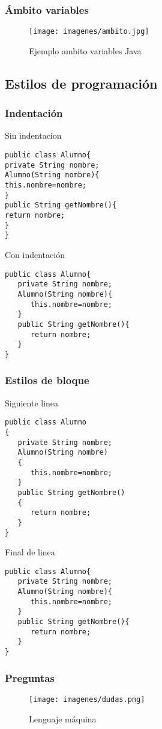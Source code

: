 \documentclass{beamer}
\begin{document}
\begin{frame}
\frametitle{Ámbito variables} 
\begin{figure}
\texttt{[image: imagenes/ambito.jpg]} 
\caption{Ejemplo ambito variables Java}
\end{figure} 
\end{frame}

\subsection{Estilos de programación}
\begin{frame}[fragile]
\frametitle{Indentación} 
\begin{small}
\begin{multicols}{2}
\begin{block}{Sin indentacion}
\begin{verbatim}
public class Alumno{
private String nombre;
Alumno(String nombre){
this.nombre=nombre;
}
public String getNombre(){
return nombre;
}     
}
\end{verbatim}
\end{block}
\pause
\begin{block}{Con indentación}
\begin{verbatim}
public class Alumno{
   private String nombre;
   Alumno(String nombre){
      this.nombre=nombre;
   }
   public String getNombre(){
      return nombre;
   }     
}
\end{verbatim}
\end{block}
\end{multicols}
\end{small}

\end{frame}

\begin{frame}[fragile]
\frametitle{Estilos de bloque} 
\begin{small}
\begin{multicols}{2}
\begin{block}{Siguiente linea}
\begin{verbatim}
public class Alumno
{
   private String nombre;
   Alumno(String nombre)
   {
      this.nombre=nombre;
   }
   public String getNombre()
   {
      return nombre;
   }     
}
\end{verbatim}
\end{block}
\pause
\begin{block}{Final de linea}
\begin{verbatim}
public class Alumno{
   private String nombre;
   Alumno(String nombre){
      this.nombre=nombre;
   }
   public String getNombre(){
      return nombre;
   }     
}
\end{verbatim}
\end{block}
\end{multicols}
\end{small}

\end{frame}

\begin{frame}
\frametitle{Preguntas} 
\begin{figure}
\texttt{[image: imagenes/dudas.png]} 
\caption{Lenguaje máquina}
\end{figure} 
\end{frame}
\end{document}
